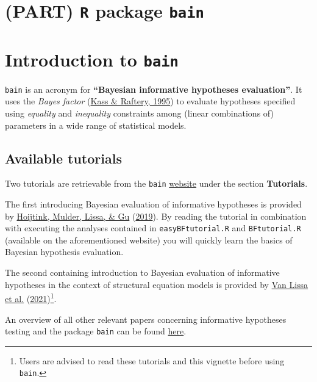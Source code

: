 \documentclass[
]{book}
\begin{document}
\hypertarget{part-r-package-bain}{%
\chapter*{\texorpdfstring{(PART) \texttt{R} package \texttt{bain}}{(PART) R package bain}}\label{part-r-package-bain}}

\hypertarget{introduction-to-bain}{%
\chapter{\texorpdfstring{Introduction to \texttt{bain}}{Introduction to bain}}\label{introduction-to-bain}}

\texttt{bain} is an acronym for \textbf{``Bayesian informative hypotheses evaluation''}.
It uses the \emph{Bayes factor} (\protect\hyperlink{ref-kass1995bayes}{Kass \& Raftery, 1995}) to evaluate hypotheses specified using \emph{equality} and \emph{inequality} constraints among (linear combinations of) parameters in a wide range of statistical models.

\hypertarget{available-tutorials}{%
\section{Available tutorials}\label{available-tutorials}}

Two tutorials are retrievable from the \texttt{bain} \href{https://informative-hypotheses.sites.uu.nl/software/bain/}{website} under the section \textbf{Tutorials}.

The first introducing Bayesian evaluation of informative hypotheses is provided by \protect\hyperlink{ref-hoijtink2019tutorial}{Hoijtink, Mulder, Lissa, \& Gu} (\protect\hyperlink{ref-hoijtink2019tutorial}{2019}). By reading the tutorial in combination with executing the analyses contained in \texttt{easyBFtutorial.R} and \texttt{BFtutorial.R} (available on the aforementioned website) you will quickly learn the basics of Bayesian hypothesis evaluation.

The second containing introduction to Bayesian evaluation of informative hypotheses in the context of structural equation models is provided by \protect\hyperlink{ref-van2021teacher}{Van Lissa et al.} (\protect\hyperlink{ref-van2021teacher}{2021})\footnote{Users are advised to read these tutorials and this vignette before using \texttt{bain}.}.

An overview of all other relevant papers concerning informative hypotheses testing and the package \texttt{bain} can be found \href{https://informative-hypotheses.sites.uu.nl/publications/}{here}.
\end{document}
